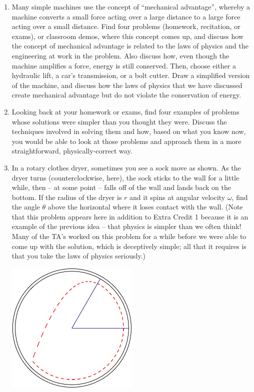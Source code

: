 \documentclass[12pt]{article}
\begin{document}
\begin{enumerate}

\item Many simple machines use the concept of ``mechanical advantage'', whereby a machine converts a small force acting over a large distance to a large force acting over a small distance. Find four problems (homework, 
recitation, or exams), or classroom demos, where this concept comes up, and discuss how the concept of mechanical advantage is related to the laws of physics and the engineering at work in the problem. Also discuss how,
even though the machine amplifies a force, energy is still conserved. Then, choose either a hydraulic lift, a car's transmission, or a bolt cutter. Draw a simplified version of the machine, and discuss how the laws of physics that we have discussed
create mechanical advantage but do not violate the conservation of energy. 

\item Looking back at your homework or exams, find four examples of problems whose solutions were simpler than you thought they were. Discuss the techniques involved in solving them and how, based on what you know now,
you would be able to look at those problems and approach them in a more straightforward, physically-correct way.

\item In a rotary clothes dryer, sometimes you see a sock move as shown. As the dryer turns (counterclockwise, here), the sock sticks to the wall for a little while,
then -- at some point -- falls off of the wall and lands back on the bottom. If the radius of the dryer is $r$ and it spins at angular velocity $\omega$, find the angle
$\theta$ above the horizontal where it loses contact with the wall. (Note that this problem appears here in addition to Extra Credit 1 because it is an example of the previous idea -- that physics is simpler than we often think! Many of the TA's worked on this problem for a while before we were able to come up with the solution, which is
deceptively simple; all that it requires is that you take the laws of physics seriously.)

\begin{center}
\includegraphics[width=0.5\textwidth]{sock-crop.pdf}
\end{center}


\end{enumerate}
\end{document}
